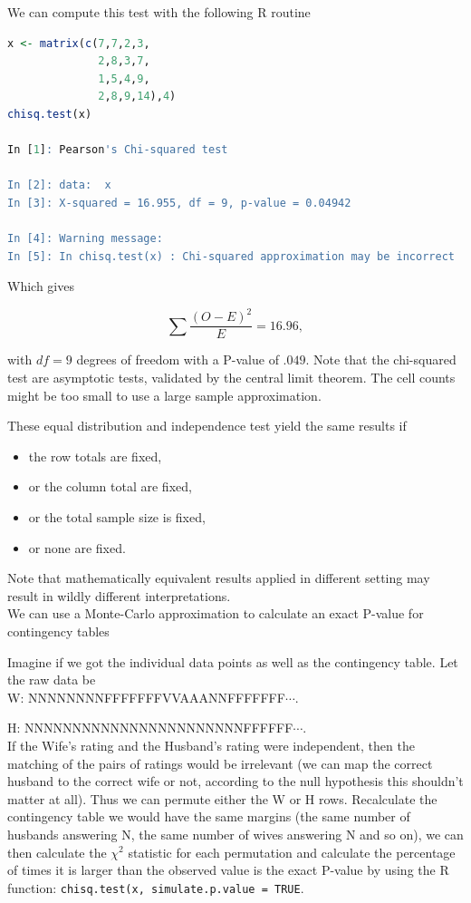 \documentclass{homework}
\begin{document}
We can compute this test with the following R routine

\begin{lstlisting}[language=R]
x <- matrix(c(7,7,2,3,
              2,8,3,7,
              1,5,4,9,
              2,8,9,14),4)
chisq.test(x)     

In [1]: Pearson's Chi-squared test

In [2]: data:  x
In [3]: X-squared = 16.955, df = 9, p-value = 0.04942

In [4]: Warning message:
In [5]: In chisq.test(x) : Chi-squared approximation may be incorrect
\end{lstlisting}

Which gives 

$$
\sum \frac{(O-E)^2}{E} = 16.96,
$$

with $df = 9$ degrees of freedom with a P-value of $.049$. Note that the chi-squared test are asymptotic tests, validated by the central limit theorem. The cell counts might be too small to use a large sample approximation. 

These equal distribution and independence test yield the same results if 

\begin{itemize}
    \item the row totals are fixed,
    \item or the column total are fixed, 
    \item or the total sample size is fixed, 
    \item or none are fixed. 
\end{itemize}

Note that mathematically equivalent results applied in different setting may result in wildly different interpretations. \\

We can use a Monte-Carlo approximation to calculate an exact P-value for contingency tables

\begin{tcolorbox}[title=Exact Permutation Test]

Imagine if we got the individual data points as well as the contingency table. Let the raw data be\\

W: NNNNNNNNFFFFFFFVVAAANNFFFFFFF$\cdots$.

H: NNNNNNNNNNNNNNNNNNNNNNNFFFFFF$\cdots$.\\

If the Wife's rating and the Husband's rating were independent, then the matching of the pairs of ratings would be irrelevant (we can map the correct husband to the correct wife or not, according to the null hypothesis this shouldn't matter at all). Thus we can permute either the W or H rows. Recalculate the contingency table we would have the same margins (the same number of husbands answering N, the same number of wives answering N and so on), we can then calculate the $\chi^2$ statistic for each permutation and calculate the percentage of times it is larger than the observed value is the exact P-value by using the R function: \texttt{chisq.test(x, simulate.p.value = TRUE}. 
\end{tcolorbox}
\end{document}
